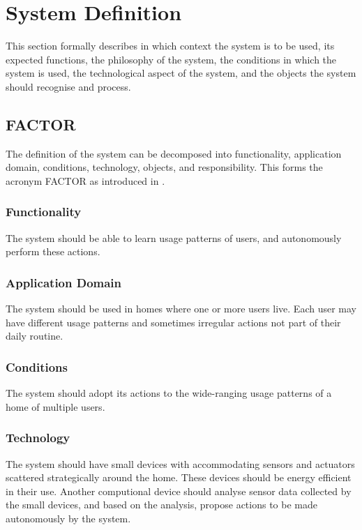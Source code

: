 \section{System Definition}

This section formally describes in which context the system is to be used, its
expected functions, the philosophy of the system, the conditions in which the
system is used, the technological aspect of the system, and the objects the
system should recognise and process.

\subsection{FACTOR}

The definition of the system can be decomposed into functionality, application
domain, conditions, technology, objects, and responsibility. This forms the
acronym FACTOR as introduced in \cite{mathiassen2001objektorienteret}.

\subsubsection{Functionality}

The system should be able to learn usage patterns of users, and autonomously
perform these actions.

\subsubsection{Application Domain}

The system should be used in homes where one or more users live. Each user may
have different usage patterns and sometimes irregular actions not part of their
daily routine.

\subsubsection{Conditions}

The system should adopt its actions to the wide-ranging usage patterns of a home
of multiple users.

\subsubsection{Technology}

The system should have small devices with accommodating sensors and actuators scattered strategically around the home.
These devices should be energy efficient in their use. Another computional
device should analyse sensor data collected by the small devices, and based on
the analysis, propose actions to be made autonomously by the system.

